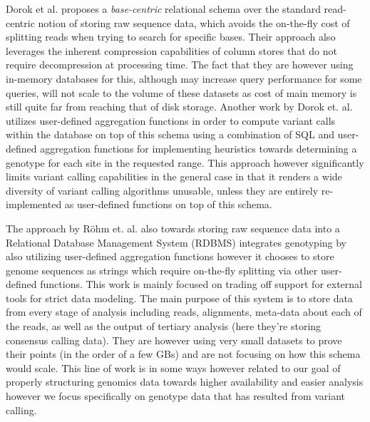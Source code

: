 \documentclass[conference,twocolumn,10pt]{IEEEtran}
\begin{document}
Dorok et al. \cite{dorok2015relational,dorok2015plants} proposes a \textit{base-centric} relational schema over the standard read-centric notion of storing raw sequence data, which avoids the on-the-fly cost of splitting reads when trying to search for specific bases. Their approach also leverages the inherent compression capabilities of column stores that do not require decompression at processing time. The fact that they are however using in-memory databases for this, although may increase query performance for some queries, will not scale to the volume of these datasets as cost of main memory is still quite far from reaching that of disk storage. Another work by Dorok et. al. \cite{dorok2014variant} utilizes user-defined aggregation functions in order to compute variant calls within the database on top of this schema using a combination of SQL and user-defined aggregation functions for implementing heuristics towards determining a genotype for each site in the requested range. This approach however significantly limits variant calling capabilities in the general case in that it renders a wide diversity of variant calling algorithms unusable, unless they are entirely re-implemented as user-defined functions on top of this schema.

The approach by R{\"o}hm et. al. \cite{rohm2009data} also towards storing raw sequence data into a Relational Database Management System (RDBMS) integrates genotyping by also utilizing user-defined aggregation functions however it chooses to store genome sequences as strings which require on-the-fly splitting via other user-defined functions. This work is mainly focused on trading off support for external tools for strict data modeling. The main purpose of this system is to store data from every stage of analysis including reads, alignments, meta-data about each of the reads, as well as the output of tertiary analysis (here they're storing consensus calling data). They are however using very small datasets to prove their points (in the order of a few GBs) and are not focusing on how this schema would scale. This line of work is in some ways however related to our goal of properly structuring genomics data towards higher availability and easier analysis however we focus specifically on genotype data that has resulted from variant calling.
\end{document}
